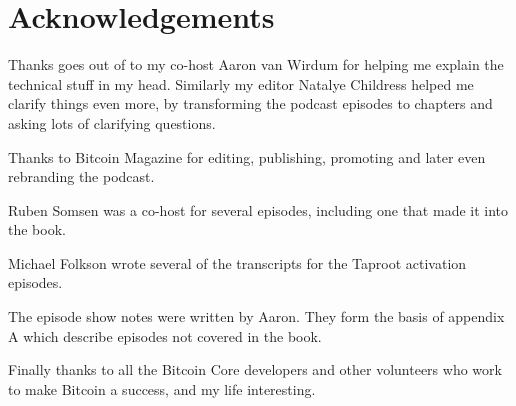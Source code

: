 \chapter{Acknowledgements}

Thanks goes out of to my co-host Aaron van Wirdum for helping me explain the technical stuff in my head. Similarly my editor Natalye Childress helped me clarify things even more, by transforming the podcast episodes to chapters and asking lots of clarifying questions.

Thanks to Bitcoin Magazine for editing, publishing, promoting and later even rebranding the podcast.

Ruben Somsen was a co-host for several episodes, including one that made it into the book.

Michael Folkson wrote several of the transcripts for the Taproot activation episodes.

The episode show notes were written by Aaron. They form the basis of appendix A which describe episodes not covered in the book.

Finally thanks to all the Bitcoin Core developers and other volunteers who work to make Bitcoin a success, and my life interesting.

\newpage

\ %

\newpage
